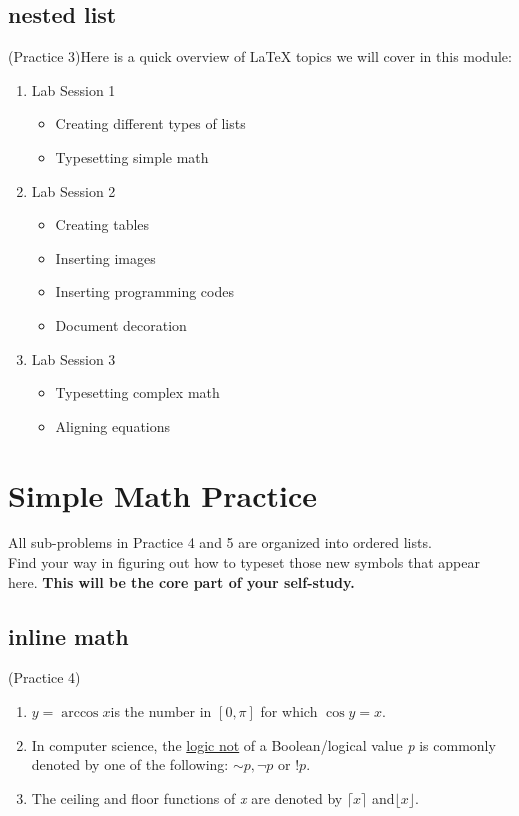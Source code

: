 \documentclass{article}
\begin{document}
	\subsection{nested list}
	(Practice 3)Here is a quick overview of \LaTeX{} topics we will cover in this module:
	\begin{enumerate}
		\item Lab Session 1
		\begin{itemize}
			\item Creating different types of lists
			\item Typesetting simple math
		\end{itemize}
		\item Lab Session 2
		\begin{itemize}
			\item Creating tables
			\item Inserting images
			\item Inserting programming codes
			\item Document decoration
		\end{itemize}
		\item Lab Session 3
		\begin{itemize}
			\item Typesetting complex math
			\item Aligning equations
		\end{itemize}
	\end{enumerate}
	
	\section{Simple Math Practice}
	All sub-problems in Practice 4 and 5 are organized into ordered lists.\\
	
	Find your way in figuring out how to typeset those new symbols that appear
	here. \textbf{This will be the core part of your self-study.}
	
	\subsection{inline math}
	(Practice 4)
	\begin{enumerate}
		\item \(y = \arccos x\)is the number in \([0,\pi]\) for which \(\cos y = x\).
		\item In computer science, the \underline{logic not} of a Boolean/logical value \textit{p} is commonly denoted by one of the following: $\sim p,\neg p$ or $!p$.
		\item The ceiling and floor functions of \textit{x} are denoted by $\lceil x \rceil$ and$\lfloor x \rfloor$.
	\end{enumerate}
\end{document}
